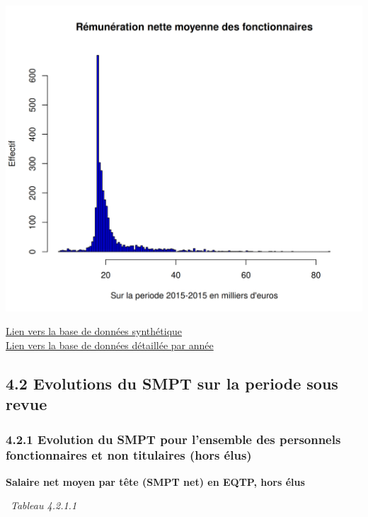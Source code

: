 \includegraphics{altair_files/figure-latex/unnamed-chunk-116-1.png}

\href{../Bases/Remunerations/Analyse.variations.csv}{Lien vers la base de
données synthétique}\\
\href{../Bases/Remunerations/Analyse.variations.par.exercice.csv}{Lien vers
la base de données détaillée par année}

\hypertarget{evolutions-du-smpt-sur-la-periode-sous-revue}{%
\subsection{4.2 Evolutions du SMPT sur la periode sous
revue}\label{evolutions-du-smpt-sur-la-periode-sous-revue}}

\hypertarget{evolution-du-smpt-pour-lensemble-des-personnels-fonctionnaires-et-non-titulaires-hors-elus}{%
\subsubsection{4.2.1 Evolution du SMPT pour l'ensemble des personnels
fonctionnaires et non titulaires (hors
élus)}\label{evolution-du-smpt-pour-lensemble-des-personnels-fonctionnaires-et-non-titulaires-hors-elus}}

\textbf{Salaire net moyen par tête (SMPT net) en EQTP, hors élus}

~\emph{Tableau 4.2.1.1}

